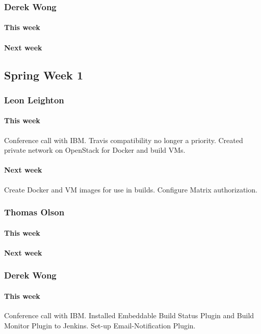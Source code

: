 \documentclass[10pt,letterpaper,onecolumn,draftclsnofoot]{IEEEtran}
\begin{document}
\subsubsection{Derek Wong}
\paragraph{This week}
\paragraph{Next week}



\subsection{Spring Week 1}
\subsubsection{Leon Leighton}
\paragraph{This week}Conference call with IBM. Travis compatibility no longer a priority.
Created private network on OpenStack for Docker and build VMs.
\paragraph{Next week}Create Docker and VM images for use in builds.
Configure Matrix authorization.

\subsubsection{Thomas Olson}
\paragraph{This week}
\paragraph{Next week}

\subsubsection{Derek Wong}
\paragraph{This week}Conference call with IBM.     
Installed Embeddable Build Status Plugin and Build Monitor Plugin to Jenkins.   
Set-up Email-Notification Plugin.
\end{document}
